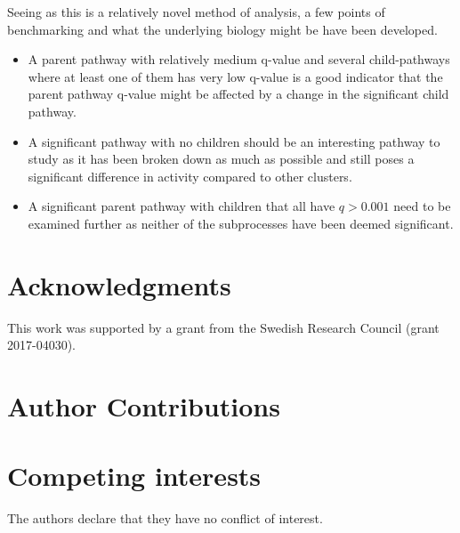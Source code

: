 \documentclass[11pt]{article}
\begin{document}
  Seeing as this is a relatively novel method of analysis, a few points of benchmarking and what the underlying biology might be have been developed.

  \begin{itemize}
      \item A parent pathway with relatively medium q-value and several child-pathways where at least one of them has very low q-value is a good indicator that the parent pathway q-value might be affected by a change in the significant child pathway.
      \item A significant pathway with no children should be an interesting pathway to study as it has been broken down as much as possible and still poses a significant difference in activity compared to other clusters.
      \item A significant parent pathway with children that all have $q > 0.001 $ need to be examined further as neither of the subprocesses have been deemed significant. 
    \end{itemize}

\section*{Acknowledgments}

This work was supported by a grant from the Swedish Research Council (grant
2017-04030).

\section*{Author Contributions}

\section*{Competing interests}

The authors declare that they have no conflict of interest.
\end{document}
